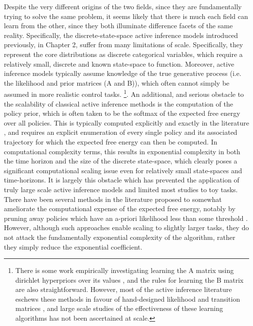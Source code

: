 Despite the very different origins of the two fields, since they are fundamentally trying to solve the same problem, it seems likely that there is much each field can learn from the other, since they both illuminate difference facets of the same reality. Specifically, the discrete-state-space active inference models introduced previously, in Chapter 2, suffer from many limitations of scale. Specifically, they represent the core distributions as discrete categorical variables, which require a relatively small, discrete and known state-space to function. Moreover, active inference models typically assume knowledge of the true generative process (i.e. the likelihood and prior matrices (A and B)), which often cannot simply be assumed in more realistic control tasks. \footnote{There is some work empirically investigating learning the A matrix using dirichlet hyperpriors over its values \citep{schwartenbeck_computational_2019}, and the rules for learning the B matrix are also straightforward. However, most of the active inference literature eschews these methods in favour of hand-designed likelihood and transition matrices \citep{friston_active_2015,friston2012active,parr2017uncertainty,friston_deep_2018}, and large scale studies of the effectiveness of these learning algorithms has not been ascertained at scale.}. An additional, and serious obstacle to the scalability of classical active inference methods is the computation of the policy prior, which is often taken to be the softmax of the expected free energy over all policies. This is typically computed explicitly and exactly in the literature \citep{da2020active,friston_active_2015}, and requires an explicit enumeration of every single policy and its associated trajectory for which the expected free energy can then be computed. In computational complexity terms, this results in exponential complexity in both the time horizon and the size of the discrete state-space, which clearly poses a significant computational scaling issue even for relatively small state-spaces and time-horizons. It is largely this obstacle which has prevented the application of truly large scale active inference models and limited most studies to toy tasks. There have been several methods in the literature proposed to somewhat ameliorate the computational expense of the expected free energy, notably by pruning away policies which have an a-priori likelihood less than some threshold \citep{friston2020sophisticated}. However, although such approaches enable scaling to slightly larger tasks, they do not attack the fundamentally exponential complexity of the algorithm, rather they simply reduce the exponential coefficient.


